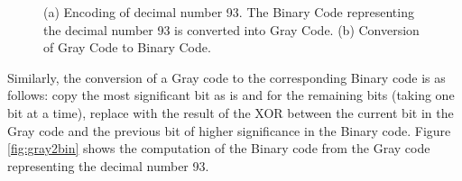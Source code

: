 \documentclass[final,12pt,3p]{elsarticle}
\begin{document}
\begin{figure}[!ht]
	\centering
	\caption{(a) Encoding of decimal number 93. The Binary Code representing the decimal number 93 is converted into Gray Code. (b) Conversion of Gray Code to Binary Code.}
\end{figure}

Similarly, the conversion of a Gray code to the corresponding Binary code is as follows: 
copy the most significant bit as is and for the remaining bits (taking one bit at a time), replace with the result of the XOR between the current bit in the Gray code and the previous bit of higher significance in the Binary code. Figure \ref{fig:gray2bin} shows the computation of the Binary code from the Gray code representing the decimal number 93.
\end{document}
